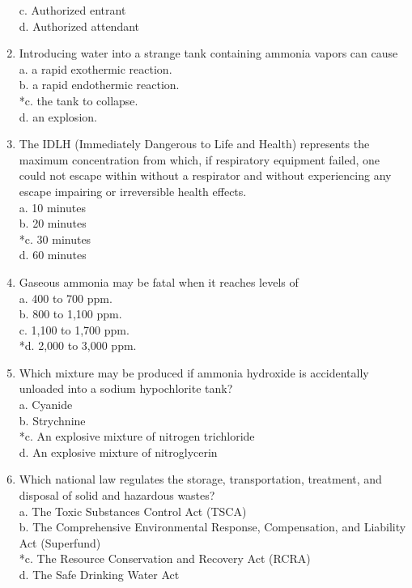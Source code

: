 \begin{enumerate}[1.]
c. Authorized entrant\\
d. Authorized attendant\\
\item Introducing water into a strange tank containing ammonia vapors can cause\\
a. a rapid exothermic reaction.\\
b. a rapid endothermic reaction.\\
*c. the tank to collapse.\\
d. an explosion.\\
\item The IDLH (Immediately Dangerous to Life and Health) represents the maximum concentration from which, if respiratory equipment failed, one could not escape within without a respirator and without experiencing any escape impairing or irreversible health effects.\\
a. 10 minutes\\
b. 20 minutes\\
*c. 30 minutes\\
d. 60 minutes\\
\item Gaseous ammonia may be fatal when it reaches levels of\\
a. 400 to 700 ppm.\\
b. 800 to 1,100 ppm.\\
c. 1,100 to 1,700 ppm.\\
*d. 2,000 to 3,000 ppm.\\
\item Which mixture may be produced if ammonia hydroxide is accidentally unloaded into a sodium hypochlorite tank?\\
a. Cyanide\\
b. Strychnine\\
*c. An explosive mixture of nitrogen trichloride\\
d. An explosive mixture of nitroglycerin\\
\item Which national law regulates the storage, transportation, treatment, and disposal of solid and hazardous wastes?\\
a. The Toxic Substances Control Act (TSCA)\\
b. The Comprehensive Environmental Response, Compensation, and Liability Act (Superfund)\\
*c. The Resource Conservation and Recovery Act (RCRA)\\
d. The Safe Drinking Water Act\\

\end{enumerate}
